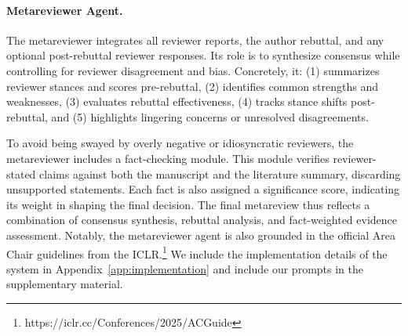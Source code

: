 \documentclass{article} %
\newcommand{\shrink}[1][0.5]{\vspace{-#1\baselineskip}}
\begin{document}
\paragraph{Metareviewer Agent.}\shrink[.75]
The metareviewer integrates all reviewer reports, the author rebuttal, and any optional post-rebuttal reviewer responses. Its role is to synthesize consensus while controlling for reviewer disagreement and bias. Concretely, it:  
(1) summarizes reviewer stances and scores pre-rebuttal,  
(2) identifies common strengths and weaknesses,  
(3) evaluates rebuttal effectiveness,  
(4) tracks stance shifts post-rebuttal, and  
(5) highlights lingering concerns or unresolved disagreements.  

To avoid being swayed by overly negative or idiosyncratic reviewers, the metareviewer includes a fact-checking module. This module verifies reviewer-stated claims against both the manuscript and the literature summary, discarding unsupported statements. Each fact is also assigned a significance score, indicating its weight in shaping the final decision. The final metareview thus reflects a combination of consensus synthesis, rebuttal analysis, and fact-weighted evidence assessment.
Notably, the metareviewer agent is also grounded in the official Area Chair guidelines from the ICLR.\footnote{https://iclr.cc/Conferences/2025/ACGuide}
We include the implementation details of the system in Appendix~\ref{app:implementation} and include our prompts in the supplementary material.
\end{document}

